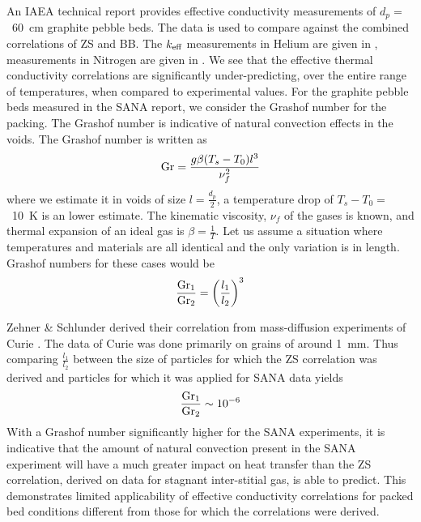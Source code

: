 An IAEA technical report provides effective conductivity measurements of $d_p =$~\SI{60}{\centi\meter} graphite pebble beds\cite{Report2000}. The data is used to compare against the combined correlations of ZS and BB. The $k_\text{eff}$ measurements in Helium are given in , measurements in Nitrogen are given in . We see that the effective thermal conductivity correlations are significantly under-predicting, over the entire range of temperatures, when compared to experimental values. For the graphite pebble beds measured in the SANA report, we consider the Grashof number for the packing. The Grashof number is indicative of natural convection effects in the voids. The Grashof number is written as
\begin{equation}
    \mathrm{Gr} = \frac{g\beta(T_s-T_0)l^3}{\nu_f^2}
\end{equation}
where we estimate it in voids of size $l = \frac{d_p}{2}$, a temperature drop of $T_s-T_0 = $~\SI{10}{\kelvin} is an lower estimate. The kinematic viscosity, $\nu_f$ of the gases is known, and thermal expansion of an ideal gas is $\beta = \frac{1}{T}$. Let us assume a situation where temperatures and materials are all identical and the only variation is in length. Grashof numbers for these cases would be
\begin{equation}
    \frac{\mathrm{Gr}_1}{\mathrm{Gr}_2} = \left(\frac{l_1}{l_2}\right)^3
\end{equation}

Zehner \& Schlunder derived their correlation from mass-diffusion experiments of Curie \cite{Currie2002}. The data of Curie was done primarily on grains of around \SI{1}{\milli\meter}. Thus comparing $\frac{l_1}{l_2}$ between the size of particles for which the ZS correlation was derived and particles for which it was applied for SANA data yields
\begin{equation}
    \frac{\mathrm{Gr}_1}{\mathrm{Gr}_2} \sim 10^{-6}
\end{equation}
With a Grashof number significantly higher for the SANA experiments, it is indicative that the amount of natural convection present in the SANA experiment will have a much greater impact on heat transfer than the ZS correlation, derived on data for stagnant inter-stitial gas, is able to predict. This demonstrates limited applicability of effective conductivity correlations for packed bed conditions different from those for which the correlations were derived.

